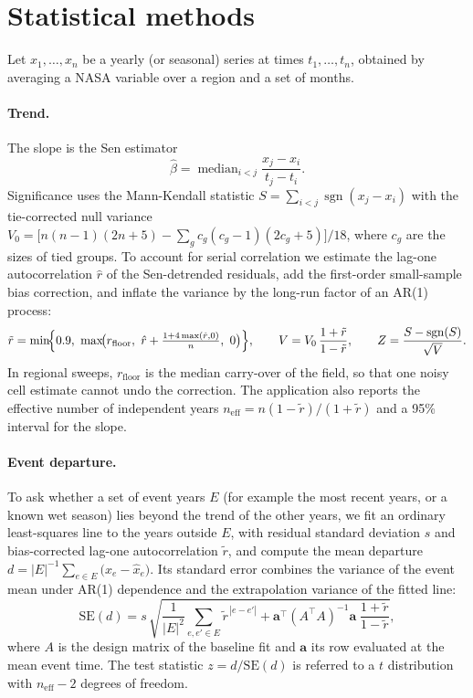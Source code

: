 \documentclass[11pt,a4paper]{article}
\begin{document}
\section{Statistical methods}
\label{sec:stats}

Let $x_1,\dots,x_n$ be a yearly (or seasonal) series at times $t_1,\dots,t_n$, obtained by averaging a NASA variable
over a region and a set of months.

\paragraph{Trend.} The slope is the Sen estimator
\begin{equation}
  \hat\beta = \operatorname{median}_{i<j} \frac{x_j - x_i}{t_j - t_i}.
\end{equation}
Significance uses the Mann-Kendall statistic $S = \sum_{i<j}\operatorname{sgn}(x_j-x_i)$ with the tie-corrected null
variance $V_0 = \bigl[n(n-1)(2n+5) - \sum_g c_g(c_g-1)(2c_g+5)\bigr]/18$, where $c_g$ are the sizes of tied groups.
To account for serial correlation we estimate the lag-one autocorrelation $\hat r$ of the Sen-detrended residuals, add
the first-order small-sample bias correction, and inflate the variance by the long-run factor of an AR(1) process:
\begin{equation}
  \tilde r = \min\!\Bigl\{0.9,\ \max\!\bigl(r_{\mathrm{floor}},\ \hat r + \tfrac{1 + 4\max(\hat r,0)}{n},\ 0\bigr)\Bigr\},
  \qquad
  V = V_0\,\frac{1+\tilde r}{1-\tilde r},
  \qquad
  Z = \frac{S - \operatorname{sgn}(S)}{\sqrt{V}} .
  \label{eq:mk}
\end{equation}
In regional sweeps, $r_{\mathrm{floor}}$ is the median carry-over of the field, so that one noisy cell estimate cannot
undo the correction. The application also reports the effective number of independent years
$n_{\mathrm{eff}} = n(1-\tilde r)/(1+\tilde r)$ and a 95\% interval for the slope.

\paragraph{Event departure.} To ask whether a set of event years $E$ (for example the most recent years, or a known
wet season) lies beyond the trend of the other years, we fit an ordinary least-squares line to the years outside $E$,
with residual standard deviation $s$ and bias-corrected lag-one autocorrelation $\tilde r$, and compute the mean
departure $d = |E|^{-1}\sum_{e\in E}\bigl(x_e - \hat x_e\bigr)$. Its standard error combines the variance of the
event mean under AR(1) dependence and the extrapolation variance of the fitted line:
\begin{equation}
  \mathrm{SE}(d) = s\,\sqrt{\frac{1}{|E|^2}\sum_{e,e'\in E}\tilde r^{\,|e-e'|}
      + \mathbf{a}^\top (A^\top A)^{-1}\mathbf{a}\;\frac{1+\tilde r}{1-\tilde r}},
  \label{eq:event}
\end{equation}
where $A$ is the design matrix of the baseline fit and $\mathbf{a}$ its row evaluated at the mean event time. The test
statistic $z = d/\mathrm{SE}(d)$ is referred to a $t$ distribution with $n_{\mathrm{eff}}-2$ degrees of freedom.
\end{document}
